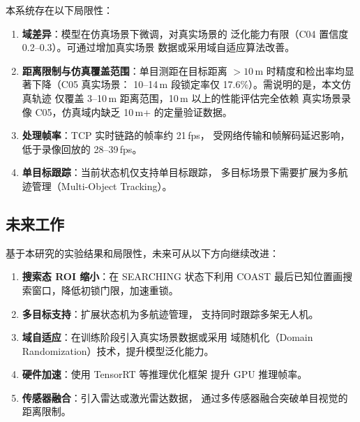 \documentclass[12pt, a4paper]{ctexart}
\begin{document}
本系统存在以下局限性：

\begin{enumerate}
  \item \textbf{域差异}：模型在仿真场景下微调，对真实场景的
        泛化能力有限（C04 置信度 0.2--0.3）。可通过增加真实场景
        数据或采用域自适应算法改善。

  \item \textbf{距离限制与仿真覆盖范围}：单目测距在目标距离
        $> 10$\,m 时精度和检出率均显著下降（C05 真实场景：
        10--14\,m 段锁定率仅 17.6\%）。需说明的是，本文仿真轨迹
        仅覆盖 3--10\,m 距离范围，10\,m 以上的性能评估完全依赖
        真实场景录像 C05，仿真域内缺乏 10\,m+ 的定量验证数据。

  \item \textbf{处理帧率}：TCP 实时链路的帧率约 21\,fps，
        受网络传输和帧解码延迟影响，低于录像回放的 28--39\,fps。

  \item \textbf{单目标跟踪}：当前状态机仅支持单目标跟踪，
        多目标场景下需要扩展为多航迹管理（Multi-Object Tracking）。
\end{enumerate}

\subsection{未来工作}

基于本研究的实验结果和局限性，未来可从以下方向继续改进：

\begin{enumerate}
  \item \textbf{搜索态 ROI 缩小}：在 SEARCHING 状态下利用 COAST
        最后已知位置画搜索窗口，降低初锁门限，加速重锁。

  \item \textbf{多目标支持}：扩展状态机为多航迹管理，
        支持同时跟踪多架无人机。

  \item \textbf{域自适应}：在训练阶段引入真实场景数据或采用
        域随机化（Domain Randomization）技术，提升模型泛化能力。

  \item \textbf{硬件加速}：使用 TensorRT 等推理优化框架
        提升 GPU 推理帧率。

  \item \textbf{传感器融合}：引入雷达或激光雷达数据，
        通过多传感器融合突破单目视觉的距离限制。
\end{enumerate}

\end{document}
